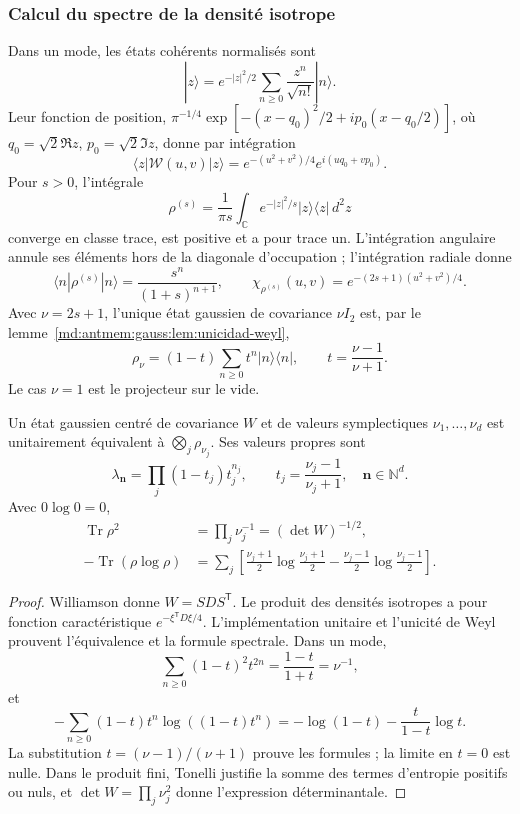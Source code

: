 \subsubsection{Calcul du spectre de la densité isotrope}
Dans un mode, les états cohérents normalisés sont
\[
 |z\rangle=e^{-|z|^2/2}\sum_{n\geq0}\frac{z^n}{\sqrt{n!}}|n\rangle.
\]
Leur fonction de position,
\(\pi^{-1/4}\exp[-(x-q_0)^2/2+ip_0(x-q_0/2)]\), où
\(q_0=\sqrt2\Re z\), \(p_0=\sqrt2\Im z\), donne par intégration
\[
 \langle z|\mathcal W(u,v)|z\rangle
 =e^{-(u^2+v^2)/4}e^{i(uq_0+vp_0)}.
\]
Pour \(s>0\), l’intégrale
\[
 \rho^{(s)}=\frac1{\pi s}\int_{\mathbb C} e^{-|z|^2/s}
 |z\rangle\langle z|\,d^2z
\]
converge en classe trace, est positive et a pour trace un. L’intégration
angulaire annule ses éléments hors de la diagonale d’occupation ; l’intégration
radiale donne
\[
 \langle n|\rho^{(s)}|n\rangle=\frac{s^n}{(1+s)^{n+1}},\qquad
 \chi_{\rho^{(s)}}(u,v)=e^{-(2s+1)(u^2+v^2)/4}.
\]
Avec \(\nu=2s+1\), l’unique état gaussien de covariance
\(\nu I_2\) est, par le lemme~\ref{md:antmem:gauss:lem:unicidad-weyl},
\begin{equation}
 \rho_\nu=(1-t)\sum_{n\geq0}t^n|n\rangle\langle n|,
 \qquad t=\frac{\nu-1}{\nu+1}.
 \label{md:antmem:gauss:eq:estado-geometrico}
\end{equation}
Le cas \(\nu=1\) est le projecteur sur le vide.

\begin{theorem}
\label{md:antmem:gauss:thm:espectro-gaussiano}
Un état gaussien centré de covariance \(W\) et de valeurs
symplectiques \(\nu_1,\ldots,\nu_d\) est unitairement équivalent
à \(\bigotimes_j\rho_{\nu_j}\). Ses valeurs propres sont
\[
 \lambda_{\mathbf n}=\prod_j(1-t_j)t_j^{n_j},\qquad
 t_j=\frac{\nu_j-1}{\nu_j+1},\quad \mathbf n\in\mathbb N^d.
\]
Avec \(0\log0=0\),
\begin{align}
 \operatorname{Tr}\rho^2&=\prod_j\nu_j^{-1}=(\det W)^{-1/2},
 \label{md:antmem:gauss:eq:pureza-general}\\
 -\operatorname{Tr}(\rho\log\rho)&=\sum_j
 \left[\frac{\nu_j+1}{2}\log\frac{\nu_j+1}{2}
 -\frac{\nu_j-1}{2}\log\frac{\nu_j-1}{2}\right].
 \label{md:antmem:gauss:eq:entropia-general}
\end{align}
\end{theorem}
\begin{proof}
Williamson donne \(W=SDS^{\mathsf T}\). Le produit des densités
isotropes a pour fonction caractéristique \(e^{-\xi^{\mathsf T}D\xi/4}\).
L’implémentation unitaire et l’unicité de Weyl prouvent
l’équivalence et la formule spectrale. Dans un mode,
\[
 \sum_{n\geq0}(1-t)^2t^{2n}=\frac{1-t}{1+t}=\nu^{-1},
\]
et
\[
 -\sum_{n\geq0}(1-t)t^n\log((1-t)t^n)
 =-\log(1-t)-\frac{t}{1-t}\log t.
\]
La substitution \(t=(\nu-1)/(\nu+1)\) prouve les formules ; la
limite en \(t=0\) est nulle. Dans le produit fini, Tonelli justifie
la somme des termes d’entropie positifs ou nuls, et
\(\det W=\prod_j\nu_j^2\) donne l’expression déterminantale.

\end{proof}

